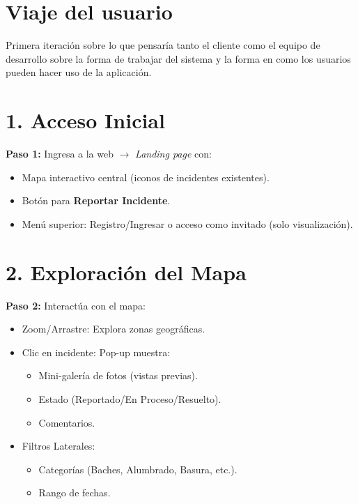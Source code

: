 \section{Viaje del usuario}

Primera iteración sobre lo que pensaría tanto el cliente como el equipo de desarrollo sobre la forma de trabajar del sistema y la forma en como los usuarios pueden hacer uso de la aplicación.

\begin{multicols}{2}

\section*{1. Acceso Inicial}

\textbf{Paso 1:} Ingresa a la web $\rightarrow$ \textit{Landing page} con:

\begin{itemize}
    \item Mapa interactivo central (iconos de incidentes existentes).
    \item Botón para \textbf{Reportar Incidente}.
    \item Menú superior: Registro/Ingresar o acceso como invitado (solo visualización).
\end{itemize}

\section*{2. Exploración del Mapa}

\textbf{Paso 2:} Interactúa con el mapa:
\begin{itemize}
    \item Zoom/Arrastre: Explora zonas geográficas.
    \item Clic en incidente: Pop-up muestra:
    \begin{itemize}
        \item Mini-galería de fotos (vistas previas).
        \item Estado (Reportado/En Proceso/Resuelto).
        \item Comentarios.
    \end{itemize}
    \item Filtros Laterales:
    \begin{itemize}
        \item Categorías (Baches, Alumbrado, Basura, etc.).
        \item Rango de fechas.        
    \end{itemize}
\end{itemize}


\end{multicols}
